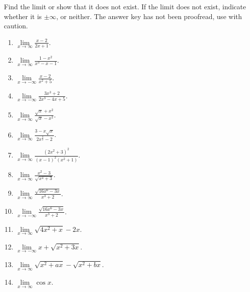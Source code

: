 Find the limit or show that it does not exist. If the limit does not exist, indicate whether it is $\pm\infty$, or neither. The answer key has not been proofread, use with caution.
\begin{multicols}{3}
\begin{enumerate}[ref={\fcProblemRef}]
\item $\displaystyle \lim\limits_{x\to\infty }\frac{x-2}{2x+1}$.

\item $\displaystyle \lim\limits_{x\to\infty }\frac{1-x^2}{x^3-x-1}$.

\item $\displaystyle \lim\limits_{x\to-\infty }\frac{x-2}{x^2+5}$.

\item \label{problemlimxtominusinfty(3x^3+2)/(2x^3-4x+5)} $\displaystyle \lim\limits_{x\to-\infty }\frac{3x^3+2}{2x^3-4x+5}$.

\item $\displaystyle \lim\limits_{x\to\infty }\frac{\sqrt{x}+x^2}{\sqrt{x}-x^2}$.

\item $\displaystyle \lim\limits_{x\to\infty }\frac{3-x\sqrt{x}}{2x^{\frac{3}{2}}-2}$.

\item $\displaystyle \lim\limits_{x\to\infty }\frac{(2x^2+3)^2}{(x-1)^2(x^2+1)}$.

\item $\displaystyle \lim\limits_{x\to\infty }\frac{x^2-3}{\sqrt{x^4+3}}$.

\item $\displaystyle \lim\limits_{x\to\infty }\frac{\sqrt{16x^6-3x}}{x^3+2}$.

\item $\displaystyle \lim\limits_{x\to-\infty }\frac{\sqrt{16x^6-3x}}{x^3+2}$.

\item $\displaystyle \lim\limits_{x\to\infty}\sqrt{4x^2+x}-2x$.

\item $\displaystyle \lim\limits_{x\to-\infty} x+\sqrt{x^2+3x} $.

\item $\displaystyle \lim\limits_{x\to\infty}\sqrt{x^2+ax}-\sqrt{x^2+bx}$.

\item $\displaystyle \lim\limits_{x\to\infty}\cos x$.


\end{enumerate}
\end{multicols}
